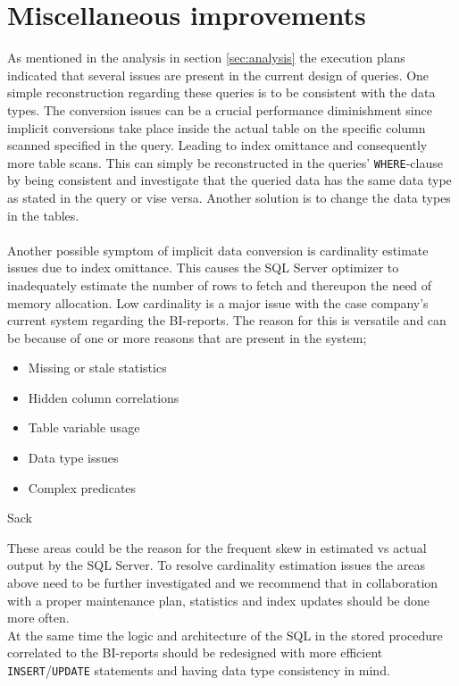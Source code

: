 \documentclass{cslthse-msc}
\begin{document}
\section{Miscellaneous improvements}
As mentioned in the analysis in section \ref{sec:analysis} the execution plans indicated that several issues are present in the current design of queries. One simple reconstruction regarding these queries is to be consistent with the data types. The conversion issues can be a crucial performance diminishment since implicit conversions take place inside the actual table on the specific column scanned specified in the query. Leading to index omittance and consequently more table scans. This can simply be reconstructed in the queries' \texttt{WHERE}-clause by being consistent and investigate that the queried data has the same data type as stated in the query or vise versa. Another solution is to change the data types in the tables.\\\\
Another possible symptom of implicit data conversion is cardinality estimate issues due to index omittance. This causes the SQL Server optimizer to inadequately estimate the number of rows to fetch and thereupon the need of memory allocation. Low cardinality is a major issue with the case company's current system regarding the BI-reports. The reason for this is versatile and can be because of one or more reasons that are present in the system;  
\begin{center}
\noindent\begin{minipage}[t]{0.5\linewidth}
    \begin{itemize}
    \item Missing or stale statistics
	\item Hidden column correlations
	\item Table variable usage
    \end{itemize}
    \end{minipage}%
    \begin{minipage}[t]{0.4\linewidth}
    \begin{itemize}
    \item Data type issues
	\item Complex predicates
    \end{itemize}
\end{minipage}
\end{center}
\begin{flushright}
Sack \cite{cardinality}
\end{flushright}
\noindent These areas could be the reason for the frequent skew in estimated vs actual output by the SQL Server. To resolve cardinality estimation issues the areas above need to be further investigated and we recommend that in collaboration with a proper maintenance plan, statistics and index updates should be done more often.\\ At the same time the logic and architecture of the SQL in the stored procedure correlated to the BI-reports should be redesigned with more efficient \texttt{INSERT}/\texttt{UPDATE} statements and having data type consistency in mind.
\end{document}

